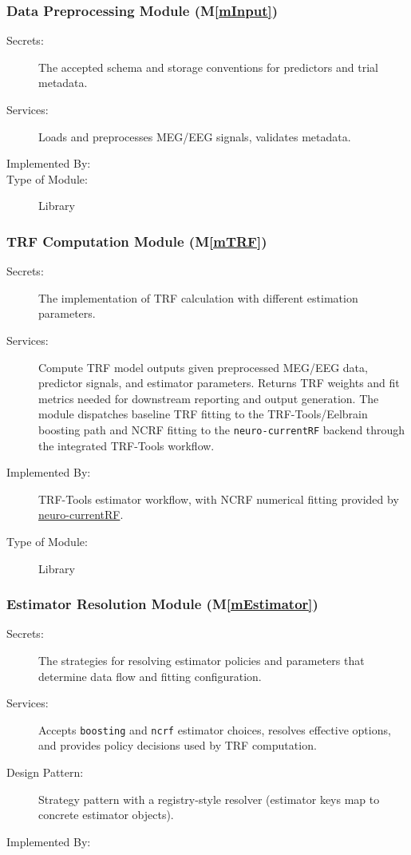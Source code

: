\documentclass[12pt, titlepage]{article}
\newcommand{\mref}[1]{M\ref{#1}}
\begin{document}
\subsubsection{Data Preprocessing Module (\mref{mInput})}

\begin{description}
\item[Secrets:]The accepted schema and storage conventions for predictors and
 trial metadata.
\item[Services:]Loads and preprocesses MEG/EEG signals, validates metadata. 
\item[Implemented By:] \progname{}
\item[Type of Module:] Library
\end{description}

\subsubsection{TRF Computation Module (\mref{mTRF})}

\begin{description}
\item[Secrets:] The implementation of TRF calculation with different estimation parameters.
\item[Services:] Compute TRF model outputs given preprocessed MEG/EEG data,
  predictor signals, and estimator parameters. Returns TRF weights and fit
  metrics needed for downstream reporting and output generation. The module
  dispatches baseline TRF fitting to the TRF-Tools/Eelbrain boosting path and
  NCRF fitting to the \texttt{neuro-currentRF} backend through the integrated
  TRF-Tools workflow.
\item[Implemented By:] TRF-Tools estimator workflow, with NCRF numerical fitting
provided by \href{https://github.com/Eelbrain/neuro-currentRF}{neuro-currentRF}.
\item[Type of Module:] Library
\end{description}

\subsubsection{Estimator Resolution Module (\mref{mEstimator})}

\begin{description}
\item[Secrets:] The strategies for resolving estimator policies and parameters that
  determine data flow and fitting configuration.
\item[Services:] Accepts \texttt{boosting} and \texttt{ncrf} estimator choices,
  resolves effective options, and provides policy decisions used by TRF
  computation.
\item[Design Pattern:] Strategy pattern with a registry-style resolver (estimator
  keys map to concrete estimator objects).
\item[Implemented By:] \progname{}
\end{description}
\end{document}
